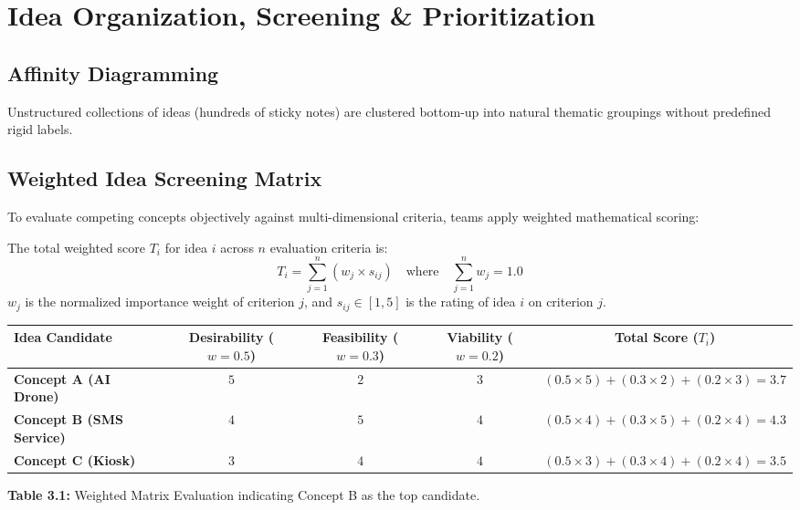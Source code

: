 \section{Idea Organization, Screening \& Prioritization}

\subsection{Affinity Diagramming}
Unstructured collections of ideas (hundreds of sticky notes) are clustered bottom-up into natural thematic groupings without predefined rigid labels.

\subsection{Weighted Idea Screening Matrix}
To evaluate competing concepts objectively against multi-dimensional criteria, teams apply weighted mathematical scoring:

\begin{keyequation}
The total weighted score $T_i$ for idea $i$ across $n$ evaluation criteria is:
\begin{equation}
T_i = \sum_{j=1}^n \left( w_j \times s_{ij} \right) \quad \text{where} \quad \sum_{j=1}^n w_j = 1.0
\end{equation}
$w_j$ is the normalized importance weight of criterion $j$, and $s_{ij} \in [1, 5]$ is the rating of idea $i$ on criterion $j$.
\end{keyequation}

\begin{example}
\begin{center}
\centering
\small
\renewcommand{\arraystretch}{1.2}
\begin{tabularx}{\linewidth}{X c c c c}
\toprule
\textbf{Idea Candidate} & \textbf{Desirability ($w=0.5$)} & \textbf{Feasibility ($w=0.3$)} & \textbf{Viability ($w=0.2$)} & \textbf{Total Score ($T_i$)} \\
\midrule
\textbf{Concept A (AI Drone)} & $5$ & $2$ & $3$ & $(0.5\times 5)+(0.3\times 2)+(0.2\times 3) = \mathbf{3.7}$ \\
\textbf{Concept B (SMS Service)} & $4$ & $5$ & $4$ & $(0.5\times 4)+(0.3\times 5)+(0.2\times 4) = \mathbf{4.3}$ \\
\textbf{Concept C (Kiosk)} & $3$ & $4$ & $4$ & $(0.5\times 3)+(0.3\times 4)+(0.2\times 4) = \mathbf{3.5}$ \\
\bottomrule
\end{tabularx}
{\small\textbf{Table 3.1:} Weighted Matrix Evaluation indicating Concept B as the top candidate.}
\end{center}
\end{example}

